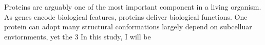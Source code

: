 Proteins are arguably one of the most important component in a living organism. As genes encode biological features, proteins deliver biological functions. One protein can adopt many structural conformations largely depend on subcelluar enviornments, yet the 3    In this study, I will be 
